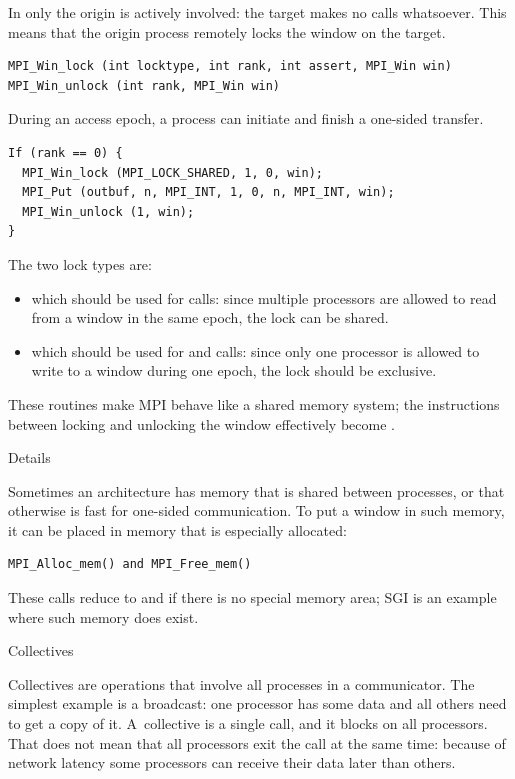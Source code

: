 In  only the origin is
actively involved: the target makes no calls whatsoever.
This means that the origin process remotely locks the window
on the target.
\begin{verbatim}
MPI_Win_lock (int locktype, int rank, int assert, MPI_Win win)
MPI_Win_unlock (int rank, MPI_Win win)
\end{verbatim}
During an access epoch, a process can initiate and finish a one-sided
transfer.
\begin{verbatim}
If (rank == 0) {
  MPI_Win_lock (MPI_LOCK_SHARED, 1, 0, win);
  MPI_Put (outbuf, n, MPI_INT, 1, 0, n, MPI_INT, win);
  MPI_Win_unlock (1, win);
}
\end{verbatim}
The two lock types are:
\begin{itemize}
\item {} which should be used for 
  calls: since multiple processors are allowed to read from a window
  in the same epoch, the lock can be shared.
\item {} which should be used for
   and  calls: since only one processor is
  allowed to write to a window during one epoch, the lock should be
  exclusive.
\end{itemize}
These routines make MPI behave like a shared memory system; the
instructions between locking and unlocking the window effectively
become .

 {Details}
\label{sec:mpi-alloc}

Sometimes an architecture has memory that is shared between processes,
or that otherwise is fast for one-sided communication. To put a window
in such memory, it can be placed in memory that is especially
allocated:
\begin{verbatim}
MPI_Alloc_mem() and MPI_Free_mem()
\end{verbatim}
These calls reduce to  and  if there is no special
memory area; SGI is an example where such memory does exist.


 {Collectives}

Collectives are operations that involve all processes in a
communicator. The simplest example is a broadcast: one processor has
some data and all others need to get a copy of it.  A~collective is a
single call, and it blocks on all processors. That does not mean that
all processors exit the call at the same time: because of network
latency some processors can receive their data later than others.

